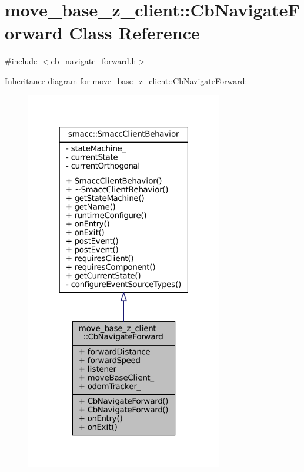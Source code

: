 \hypertarget{classmove__base__z__client_1_1CbNavigateForward}{}\section{move\+\_\+base\+\_\+z\+\_\+client\+:\+:Cb\+Navigate\+Forward Class Reference}
\label{classmove__base__z__client_1_1CbNavigateForward}


{\ttfamily \#include $<$cb\+\_\+navigate\+\_\+forward.\+h$>$}



Inheritance diagram for move\+\_\+base\+\_\+z\+\_\+client\+:\+:Cb\+Navigate\+Forward\+:
\nopagebreak
\begin{figure}[H]
\begin{center}
\leavevmode
\includegraphics[width=244pt]{classmove__base__z__client_1_1CbNavigateForward__inherit__graph}
\end{center}
\end{figure}


